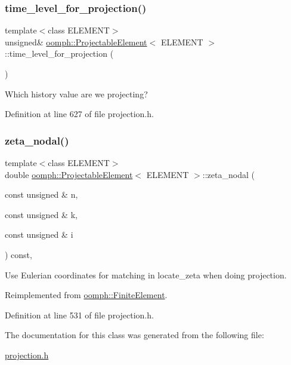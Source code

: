 \subsubsection{\texorpdfstring{time\+\_\+level\+\_\+for\+\_\+projection()}{time\_level\_for\_projection()}}
{\footnotesize\ttfamily template$<$class E\+L\+E\+M\+E\+NT$>$ \\
unsigned\& \hyperlink{classoomph_1_1ProjectableElement}{oomph\+::\+Projectable\+Element}$<$ E\+L\+E\+M\+E\+NT $>$\+::time\+\_\+level\+\_\+for\+\_\+projection (\begin{DoxyParamCaption}{ }\end{DoxyParamCaption})\hspace{0.3cm}{\ttfamily [inline]}}



Which history value are we projecting? 



Definition at line 627 of file projection.\+h.

\mbox{\label{classoomph_1_1ProjectableElement_aefceb50221fe76ac929d618495530adf}} 
\subsubsection{\texorpdfstring{zeta\+\_\+nodal()}{zeta\_nodal()}}
{\footnotesize\ttfamily template$<$class E\+L\+E\+M\+E\+NT$>$ \\
double \hyperlink{classoomph_1_1ProjectableElement}{oomph\+::\+Projectable\+Element}$<$ E\+L\+E\+M\+E\+NT $>$\+::zeta\+\_\+nodal (\begin{DoxyParamCaption}\item[{const unsigned \&}]{n,  }\item[{const unsigned \&}]{k,  }\item[{const unsigned \&}]{i }\end{DoxyParamCaption}) const\hspace{0.3cm}{\ttfamily [inline]}, {\ttfamily [virtual]}}



Use Eulerian coordinates for matching in locate\+\_\+zeta when doing projection. 



Reimplemented from \hyperlink{classoomph_1_1FiniteElement_a849561c5fbcbc07dc49d2dc6cca68559}{oomph\+::\+Finite\+Element}.



Definition at line 531 of file projection.\+h.



The documentation for this class was generated from the following file\+:\begin{DoxyCompactItemize}
\item 
\hyperlink{projection_8h}{projection.\+h}\end{DoxyCompactItemize}
